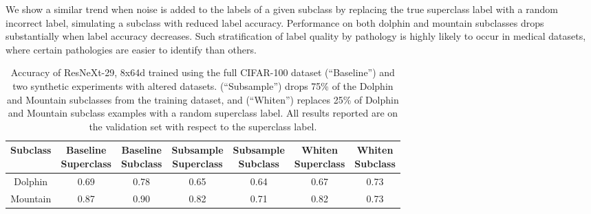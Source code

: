 \documentclass{article}
\begin{document}
We show a similar trend when noise is added to the labels of a given subclass by replacing the true superclass label with a random incorrect label, simulating a subclass with reduced label accuracy.
Performance on both dolphin and mountain subclasses drops substantially when label accuracy decreases.  
Such stratification of label quality by pathology is highly likely to occur in medical datasets, where certain pathologies are easier to identify than others.

\begin{table}[]
\centering
\begin{tabular}{|c|c|c|c|c|c|c|}
\hline
 Subclass & \makecell{Baseline \\ Superclass} & \makecell{Baseline \\ Subclass}   &  \makecell{Subsample \\ Superclass}    & \makecell{Subsample \\ Subclass}  &  \makecell{Whiten \\ Superclass}    & \makecell{Whiten \\ Subclass} \\
 \hline
 Dolphin & 0.69 & 0.78  & 0.65  & 0.64 & 0.67  & 0.73   \\
 Mountain & 0.87 & 0.90  & 0.82 & 0.71 & 0.82 & 0.73  \\
 \hline
\end{tabular}
\caption{Accuracy of ResNeXt-29, 8x64d trained using the full CIFAR-100 dataset (``Baseline'') and two synthetic experiments with altered datasets. (``Subsample'') drops 75\% of the Dolphin and Mountain subclasses from the training dataset, and (``Whiten'') replaces 25\% of Dolphin and Mountain subclass examples with a random superclass label.  All results reported are on the validation set with respect to the superclass label.}
\label{tab:cifar1}
\vspace{-8mm}
\end{table}

\end{document}
